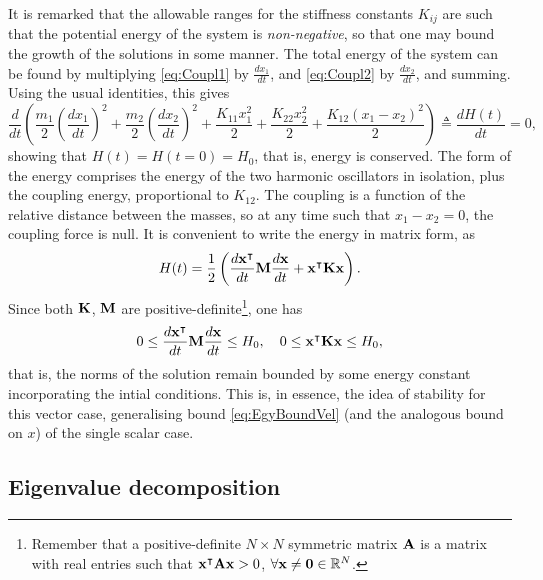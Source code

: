 \documentclass[11pt,twoside,a4paper,english]{book}
\begin{document}
It is remarked that the allowable ranges for the stiffness constants $K_{ij}$ are such that the potential energy of the system  is \emph{non-negative}, so that one may bound the growth of the solutions in some manner. The total energy of the system can be found by multiplying \eqref{eq:Coupl1} by $\frac{dx_1}{dt}$, and \eqref{eq:Coupl2} by $\frac{dx_2}{dt}$, and summing. Using the usual identities, this gives
\begin{equation}\label{eq:EnBalCnt2Masses}
\frac{d}{dt}\left( \frac{m_1}{2}\left( \frac{dx_1}{dt} \right)^2 + \frac{m_2}{2}\left( \frac{dx_2}{dt} \right)^2 + \frac{K_{11} x_1^2}{2} +  \frac{K_{22} x_2^2}{2} + \frac{K_{12} (x_1-x_2)^2}{2}\right) \triangleq \frac{dH(t)}{dt} = 0,
\end{equation}
showing that $H(t) = H(t=0) = H_0$, that is, energy is conserved. The form of the energy comprises the energy of the two harmonic oscillators in isolation, plus the coupling energy, proportional to $K_{12}$. The coupling is a function of the relative distance between the masses, so at any time such that $x_1-x_2=0$, the coupling force is null. It is convenient to write the energy in matrix form, as
\begin{equation}
H(t) = \frac{1}{2}\left(\frac{d{\bf x}^\intercal}{dt} {\bf M} \frac{d{\bf x}}{dt} + {\bf x}^\intercal {\bf K} {\bf x}\right).
\end{equation}
Since both ${\bf K}$, ${\bf M}$ are positive-definite\footnote{Remember that a positive-definite $N\times N$ symmetric matrix ${\bf A}$ is a matrix with real entries such that ${\bf x}^\intercal {\bf A} {\bf x} > 0$, $\forall {\bf x} \neq {\bf 0} \in \mathbb{R}^N$. }, one has
\begin{equation}
0 \leq \frac{d{\bf x}^\intercal}{dt} {\bf M} \frac{d{\bf x}}{dt} \leq H_0, \quad 0 \leq {\bf x}^\intercal {\bf K} {\bf x} \leq H_0,
\end{equation}
that is, the norms of the solution remain bounded by some energy constant incorporating the intial conditions. This is, in essence, the idea of stability for this vector case, generalising  bound \eqref{eq:EgyBoundVel} (and the analogous bound on $x$) of the single scalar case. 

\subsection{Eigenvalue decomposition}
\end{document}
